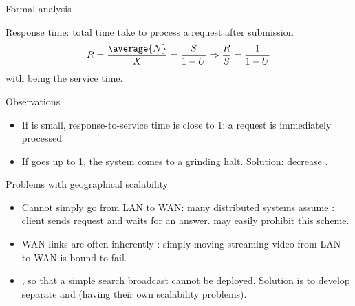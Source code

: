   \begin{slide}{Formal analysis}
    \begin{block}{Response time: total time take to process a request after submission}
      \[ R = \frac{\average{N}}{X} = \frac{S}{1-U} \Rightarrow \frac{R}{S} = \frac{1}{1-U} \]
    with  being the service time.
    \end{block}
    \begin{block}{Observations}
      \begin{itemize}
      \item If  is small, response-to-service time is close to 1: a request is immediately
        processed
      \item If  goes up to 1, the system comes to a grinding halt. \newline Solution: decrease .
      \end{itemize}
    \end{block}
  \end{slide}
\begin{slide}{Problems with geographical scalability}
  \begin{block}{}
    \begin{itemize}
    \item Cannot simply go from LAN to WAN: many distributed systems assume : client sends request and waits for an answer.  may easily prohibit this
      scheme.
    \item WAN links are often inherently : simply moving streaming video from LAN to WAN is
      bound to fail.
    \item {}, so that a simple search broadcast cannot be
      deployed. Solution is to develop separate  and  (having their own
      scalability problems).
    \end{itemize}
  \end{block}
\end{slide}

